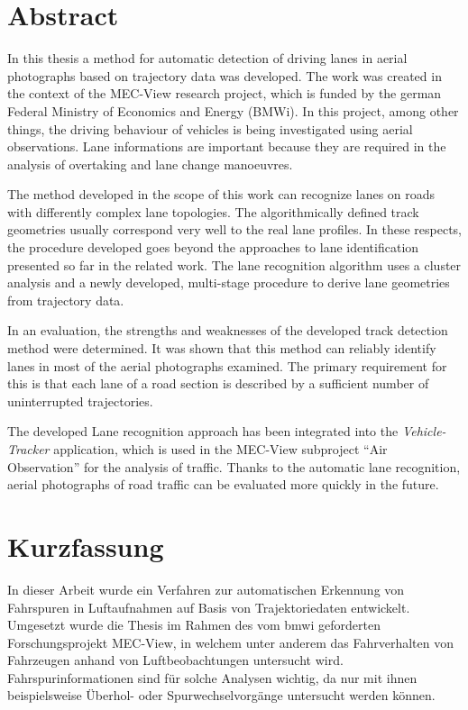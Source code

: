 
\chapter{Abstract}

In this thesis a method for automatic detection of driving lanes in aerial photographs based on trajectory data was developed.
The work was created in the context of the MEC-View research project, which is funded by the german Federal Ministry of Economics and Energy (BMWi).
In this project, among other things, the driving behaviour of vehicles is being investigated using aerial observations.
Lane informations are important because they are required in the analysis of overtaking and lane change manoeuvres.

The method developed in the scope of this work can recognize lanes on roads with differently complex lane topologies.
The algorithmically defined track geometries usually correspond very well to the real lane profiles.
In these respects, the procedure developed goes beyond the approaches to lane identification presented so far
in the related work.
The lane recognition algorithm uses a cluster analysis and a newly developed, multi-stage procedure to
derive lane geometries from trajectory data.

In an evaluation, the strengths and weaknesses of the developed track detection method were determined.
It was shown that this method can reliably identify lanes in most of the aerial photographs examined.
The primary requirement for this is that each lane of a road section is described by a sufficient number
of uninterrupted trajectories.

The developed Lane recognition approach has been integrated into the \textit{Vehicle-Tracker} application,
which is used in the MEC-View subproject ``Air Observation'' for the analysis of traffic.
Thanks to the automatic lane recognition, aerial photographs of road traffic can be evaluated more quickly in the future.

\chapter{Kurzfassung}

In dieser Arbeit wurde ein Verfahren zur automatischen Erkennung von Fahrspuren in Luftaufnahmen
auf Basis von Trajektoriedaten entwickelt. Umgesetzt wurde die Thesis im Rahmen des vom \acrshort*{bmwi}
geforderten Forschungsprojekt MEC-View, in welchem unter anderem das Fahrverhalten von Fahrzeugen
anhand von Luftbeobachtungen untersucht wird. Fahrspurinformationen sind für solche Analysen
wichtig, da nur mit ihnen beispielsweise Überhol- oder Spurwechselvorgänge untersucht werden können.

